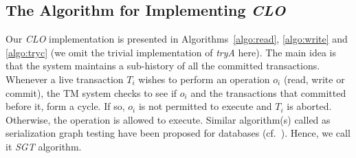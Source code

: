 \documentclass{llncs}
\newcommand{\op} {operation}
\newcommand{\clo} {\textit{CLO}}
\newcommand{\tobj} {t-object}
\newcommand{\gchist} {\textit{gComHist}}
\newcommand{\lchist} {\textit{lComHist}}
\newcommand{\thist} {\textit{tHist}}
\newcommand{\lseq} {\textit{lseq}}
\newcommand{\trya}{\textit{tryA}}
\newcommand{\rvar} {\textit{readVar}}
\newcommand{\rop} {\textit{rop}}
\newcommand{\sgt} {SGT}
\begin{document}
\subsection{The Algorithm for Implementing \clo}
\label{subsec:algo}

Our \clo{} implementation is presented in Algorithms~\ref{algo:read}, \ref{algo:write} and \ref{algo:tryc} (we omit the trivial implementation of \trya{} here).
The main idea is that the system maintains a sub-history of 
all the committed transactions. 
Whenever a live transaction $T_i$  wishes to perform an \op{} $o_i$ 
(read, write or commit), the
TM system checks to see if $o_i$ and the transactions that committed
before it,  form a cycle. If so, $o_i$ is not permitted to execute and
$T_i$ is aborted.  Otherwise, the \op{} is allowed to execute. 
Similar algorithm(s) called as serialization graph testing have been
proposed for databases (cf.~\cite[Chap.~4]{WeiVoss:2002:Morg}). Hence, we call it \textit{\sgt{}} algorithm. 



\begin{algorithm}
\caption{Read of a \tobj{} $x$ by a transaction $T_i$} \label{algo:read}
\end{algorithm}
\end{document}
